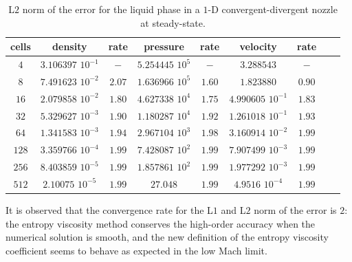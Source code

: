 \begin{table}[H]
\begin{center}
 \caption{\label{tbl:l2_norm_liq} L$2$ norm of the error for the liquid phase in a $1$-D convergent-divergent nozzle at steady-state.}
 \begin{tabular}{|c|c|c|c|c|c|c|c|c|}
 \hline
   cells & density & rate & pressure & rate & velocity & rate \\
 \hline
$4$ &   $3.106397$ $10^{-1}$ & $-$ & $5.254445$ $10^{5}$ & $-$ & $3.288543$                   & $-$\\
  \hline
$8$  &  $7.491623$ $10^{-2}$ & $2.07$ & $1.636966$ $10^{5}$ & $1.60$ & $1.823880$                   & $0.90$\\
   \hline
$16$ & $2.079858$ $10^{-2}$ & $1.80$ & $4.627338$ $10^{4}$ & $1.75$ & $4.990605$ $10^{-1}$ & $1.83$\\
 \hline
$32$ & $5.329627$ $10^{-3}$ & $1.90$ & $1.180287$ $10^{4}$ & $1.92$ & $1.261018$ $10^{-1}$ & $1.93$\\
 \hline
$64$ & $1.341583$ $10^{-3}$ & $1.94$ & $2.967104$ $10^{3}$ & $1.98$ & $3.160914$ $10^{-2}$ & $1.99$\\
 \hline
$128$&$3.359766$ $10^{-4}$ & $1.99$ & $7.428087$ $10^{2}$ & $1.99$ & $7.907499$ $10^{-3}$ & $1.99$\\
 \hline
$256$&$8.403859$ $10^{-5}$& $1.99$ & $1.857861$ $10^{2}$ & $1.99$ & $1.977292$ $10^{-3}$ & $1.99$\\
 \hline
 $512$&$2.10075$ $10^{-5}$& $1.99$ & $27.048$ & $1.99$ & $4.9516$ $10^{-4}$ & $1.99$\\
 \hline
\end{tabular}
\end{center}
\nonumber
\end{table}
It is observed that the convergence rate for the L$1$ and L$2$ norm of the error is $2$: the entropy viscosity method conserves the high-order accuracy when the numerical solution is smooth, and the new definition of the entropy viscosity coefficient seems to behave as expected in the low Mach limit.
